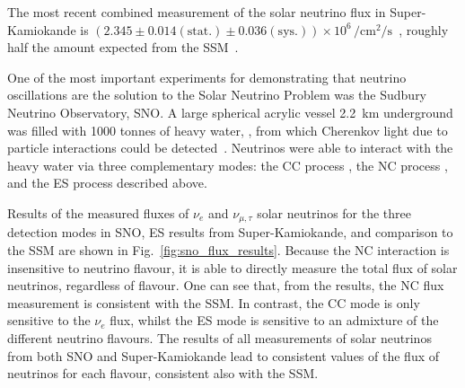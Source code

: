 \begin{figure}
    \centering
    \caption[]{}
    \label{fig:nu_e_es_xsec}
\end{figure}

The most recent combined measurement of the \beight{} solar neutrino flux in Super-Kamiokande is $(2.345\pm0.014(\mathrm{stat.})\pm0.036(\mathrm{sys.}))\times10^{6}\,\si{\per\cm\squared\per\second}$~\cite{abeSolarNeutrinoMeasurements2016}, roughly half the amount expected from the SSM~\cite{vinyolesB16StandardSolar2018}.

One of the most important experiments for demonstrating that neutrino oscillations are the solution to the Solar Neutrino Problem was the Sudbury Neutrino Observatory, SNO. A large spherical acrylic vessel \SI{2.2}{\km} underground was filled with \num{1000} tonnes of heavy water, , from which Cherenkov light due to particle interactions could be detected~\cite{BOGER2000172}. Neutrinos were able to interact with the heavy water via three complementary modes: the CC process , the NC process , and the ES process described above.

Results of the measured fluxes of $\nu_{e}$ and $\nu_{\mu,\tau}$ solar neutrinos for the three detection modes in SNO, ES results from Super-Kamiokande, and comparison to the SSM are shown in Fig.~\ref{fig:sno_flux_results}. Because the NC interaction is insensitive to neutrino flavour, it is able to directly measure the total flux of \beight{} solar neutrinos, regardless of flavour. One can see that, from the results, the NC flux measurement is consistent with the SSM. In contrast, the CC mode is only sensitive to the $\nu_{e}$ flux, whilst the ES mode is sensitive to an admixture of the different neutrino flavours. The results of all measurements of solar neutrinos from both SNO and Super-Kamiokande lead to consistent values of the flux of \beight{} neutrinos for each flavour, consistent also with the SSM.

